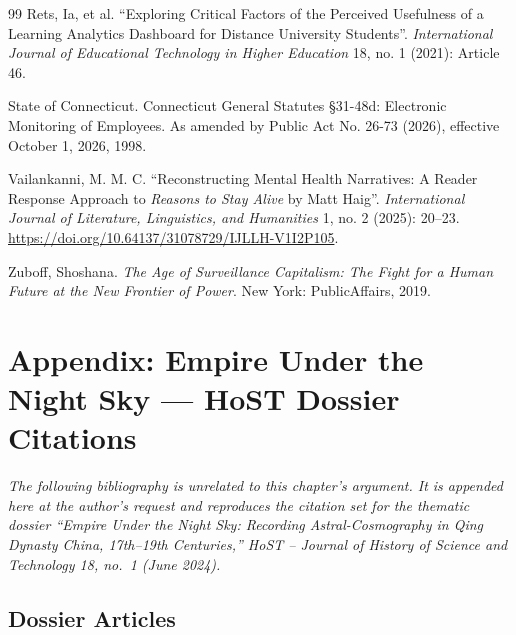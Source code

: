 \documentclass[12pt]{article}
\begin{document}
\begin{thebibliography}{99}
 Rets, Ia, et al. ``Exploring Critical Factors of the Perceived Usefulness of a Learning Analytics Dashboard for Distance University Students''. \emph{International Journal of Educational Technology in Higher Education} 18, no. 1 (2021): Article 46.

 State of Connecticut. Connecticut General Statutes \S 31-48d: Electronic Monitoring of Employees. As amended by Public Act No. 26-73 (2026), effective October 1, 2026, 1998.

 Vailankanni, M. M. C. ``Reconstructing Mental Health Narratives: A Reader Response Approach to \emph{Reasons to Stay Alive} by Matt Haig''. \emph{International Journal of Literature, Linguistics, and Humanities} 1, no. 2 (2025): 20--23. \url{https://doi.org/10.64137/31078729/IJLLH-V1I2P105}.

 Zuboff, Shoshana. \emph{The Age of Surveillance Capitalism: The Fight for a Human Future at the New Frontier of Power}. New York: PublicAffairs, 2019.

\end{thebibliography}

\newpage
\appendix
\section*{Appendix: Empire Under the Night Sky --- HoST Dossier Citations}

\textit{The following bibliography is unrelated to this chapter's argument. It is appended here at the author's request and reproduces the citation set for the thematic dossier ``Empire Under the Night Sky: Recording Astral-Cosmography in Qing Dynasty China, 17th--19th Centuries,'' \emph{HoST -- Journal of History of Science and Technology} 18, no.\ 1 (June 2024).}

\subsection*{Dossier Articles}
\end{document}
